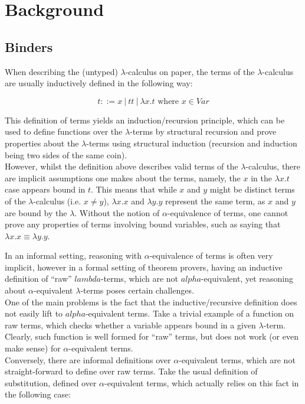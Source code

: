 \documentclass[a4paper, 12pt, twoside]{style/ociamthesis}
\theoremstyle{plain}
\theoremstyle{definition}
\theoremstyle{remark}
\begin{document}
\chapter{Background}\label{background}

\section{Binders}\label{binders}

\label{binders}

When describing the (untyped) \(\lambda\)-calculus on paper, the terms
of the \(\lambda\)-calculus are usually inductively defined in the
following way:

\[t::= x\ |\ tt\ |\ \lambda x.t \text{ where }x \in Var\]

This definition of terms yields an induction/recursion principle, which
can be used to define functions over the \(\lambda\)-terms by structural
recursion and prove properties about the \(\lambda\)-terms using
structural induction (recursion and induction being two sides of the
same coin).\\
However, whilst the definition above describes valid terms of the
\(\lambda\)-calculus, there are implicit assumptions one makes about the
terms, namely, the \(x\) in the \(\lambda x.t\) case appears bound in
\(t\). This means that while \(x\) and \(y\) might be distinct terms of
the \(\lambda\)-calculus (i.e. \(x \neq y\)), \(\lambda x.x\) and
\(\lambda y.y\) represent the same term, as \(x\) and \(y\) are bound by
the \(\lambda\). Without the notion of \(\alpha\)-equivalence of terms,
one cannot prove any properties of terms involving bound variables, such
as saying that \(\lambda x.x \equiv \lambda y.y\).

In an informal setting, reasoning with \(\alpha\)-equivalence of terms
is often very implicit, however in a formal setting of theorem provers,
having an inductive definition of ``raw'' \(lambda\)-terms, which are
not \(alpha\)-equivalent, yet reasoning about \(\alpha\)-equivalent
\(\lambda\)-terms poses certain challenges.\\
One of the main problems is the fact that the inductive/recursive
definition does not easily lift to \(alpha\)-equivalent terms. Take a
trivial example of a function on raw terms, which checks whether a
variable appears bound in a given \(\lambda\)-term. Clearly, such
function is well formed for ``raw'' terms, but does not work (or even
make sense) for \(\alpha\)-equivalent terms.\\
Conversely, there are informal definitions over \(\alpha\)-equivalent
terms, which are not straight-forward to define over raw terms. Take the
usual definition of substitution, defined over \(\alpha\)-equivalent
terms, which actually relies on this fact in the following case:
\end{document}
